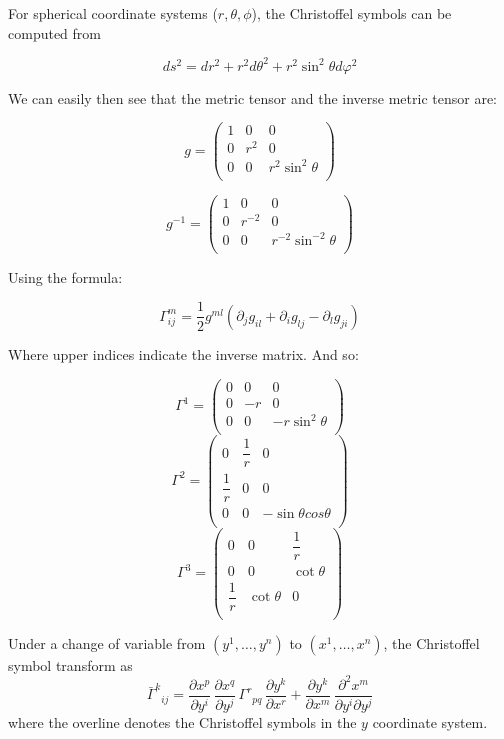 \begin{example}

 For spherical coordinate systems ($r,\theta,\phi$), the
Christoffel symbols can be computed from 

$$ds^2=dr^2+r^2d\theta^2+r^2\sin^2\theta d\varphi^2$$

We can easily then see that the metric tensor and the inverse metric tensor are:

$$g=\begin{pmatrix}1&0&0\\0&r^2&0\\0&0&r^2\sin^2\theta\\\end{pmatrix}$$

$$g^{-1}=\begin{pmatrix}1&0&0\\0&r^{-2}&0\\0&0&r^{-2}\sin^{-2}\theta\\\end{pmatrix} $$

Using the  formula:

$$\Gamma^m_{ij}=\dfrac12 g^{ml}(\partial_jg_{il}+\partial_ig_{lj}-\partial_lg_{ji} )$$

Where upper indices indicate the inverse matrix. And so:

$$\Gamma^1=\begin{pmatrix}0&0&0\\0&-r&0\\0&0&-r\sin^2\theta\\\end{pmatrix}$$
$$\Gamma^2=\begin{pmatrix}0&\dfrac1r&0\\\dfrac1r&0&0\\0&0&-\sin\theta cos\theta\\\end{pmatrix}$$
$$\Gamma^3=\begin{pmatrix}0&0&\dfrac1r\\0&0&\cot\theta\\\dfrac1r&\cot\theta&0\\\end{pmatrix}$$
 
 
\end{example}

\begin{theorem} Under a change of variable from $(y^1,\dots , y^n)$ to $(x^1,\dots , x^n)$, the Christoffel symbol transform as
\[{\bar\Gamma}^k{}_{ij} =
\frac{\partial x^p}{\partial y^i}\,
\frac{\partial x^q}{\partial y^j}\,
\Gamma^r{}_{pq}\,
\frac{\partial y^k}{\partial x^r}
+ 
\frac{\partial y^k}{\partial x^m}\, 
\frac{\partial^2 x^m}{\partial y^i \partial y^j}  
\]
where the overline denotes the Christoffel symbols in the $y$ coordinate system.  
\end{theorem}





